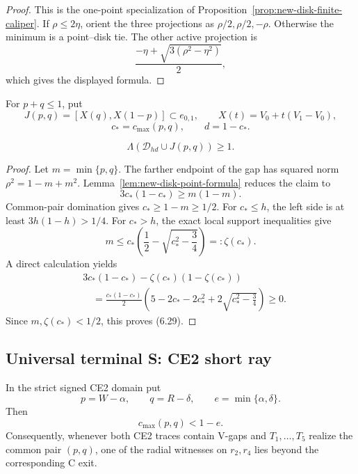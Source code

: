 

\begin{proof}
This is the one-point specialization of
Proposition~\ref{prop:new-disk-finite-caliper}.  If $\rho\le2\eta$, orient
the three projections as $\rho/2,\rho/2,-\rho$.  Otherwise the minimum is a
point--disk tie.  The other active projection is
\[
 \frac{-\eta+\sqrt{3(\rho^2-\eta^2)}}2,
\]
which gives the displayed formula.
\end{proof}

For $p+q\le1$, put
\[
 J(p,q)=[X(q),X(1-p)]\subset e_{0,1},
 \qquad X(t)=V_0+t(V_1-V_0),
\]
\[
 c_*=c_{\max}(p,q),
 \qquad d=1-c_*.
\]

\begin{theorem}
\label{thm:new-complementary-gap}
\[
 \boxed{
 \Lambda\left(\mathcal D_{hd}\cup J(p,q)\right)\ge1.
 }
 \tag{6.28}
\]
\end{theorem}



\begin{proof}
Let $m=\min\{p,q\}$.  The farther endpoint of the gap has squared norm
$\rho^2=1-m+m^2$.  Lemma~\ref{lem:new-disk-point-formula} reduces the claim
to
\[
 3c_*(1-c_*)\ge m(1-m).
 \tag{6.29}
\]
Common-pair domination gives $c_*\ge1-m\ge1/2$.  For $c_*\le h$, the left
side is at least $3h(1-h)>1/4$.  For $c_*>h$, the exact local support
inequalities give
\[
 m\le
 c_*\left(\frac12-\sqrt{c_*^2-\frac34}\right)=:\zeta(c_*).
\]
A direct calculation yields
\[
\begin{aligned}
&3c_*(1-c_*)-\zeta(c_*)(1-\zeta(c_*))\\
&\quad=
\frac{c_*(1-c_*)}{2}
\left(5-2c_*-2c_*^2+
2\sqrt{c_*^2-\frac34}\right)\ge0.
\end{aligned}
\]
Since $m,\zeta(c_*)<1/2$, this proves (6.29).
\end{proof}

\subsection{Universal terminal S: CE2 short ray}

\begin{theorem}
\label{thm:new-ce2-short-ray}
In the strict signed CE2 domain put
\[
 p=W-\alpha,\qquad q=R-\delta,\qquad
 e=\min\{\alpha,\delta\}.
\]
Then
\[
 \boxed{c_{\max}(p,q)<1-e.}
 \tag{6.30}
\]
Consequently, whenever both CE2 traces contain V-gaps and
$T_1,\ldots,T_5$ realize the common pair $(p,q)$, one of the radial
witnesses on $r_2,r_4$ lies beyond the corresponding C exit.
\end{theorem}

